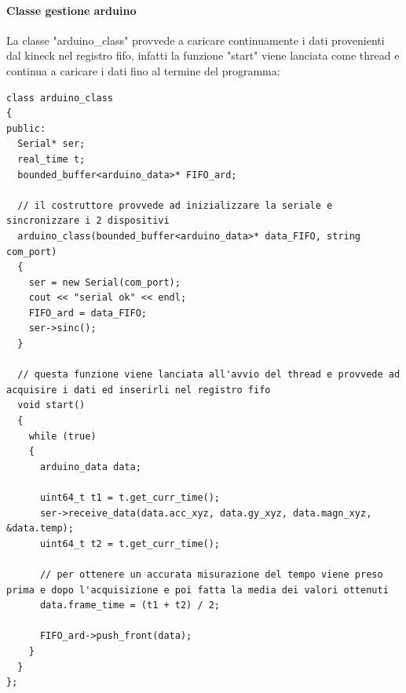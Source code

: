 \documentclass[10pt,a4paper]{article}
\begin{document}
\paragraph{Classe gestione arduino}
La classe "arduino\_class" provvede a caricare continuamente i dati provenienti dal kineck nel registro fifo, infatti la funzione "start" viene lanciata come thread e continua a caricare i dati fino al termine del programma:
\begin{lstlisting}[style=mycpp, caption=librerie usate, captionpos=b]
class arduino_class
{
public:
  Serial* ser;
  real_time t;
  bounded_buffer<arduino_data>* FIFO_ard;

  // il costruttore provvede ad inizializzare la seriale e sincronizzare i 2 dispositivi
  arduino_class(bounded_buffer<arduino_data>* data_FIFO, string com_port)
  {
    ser = new Serial(com_port);
    cout << "serial ok" << endl;
    FIFO_ard = data_FIFO;
    ser->sinc();
  }

  // questa funzione viene lanciata all'avvio del thread e provvede ad acquisire i dati ed inserirli nel registro fifo
  void start()
  {
    while (true)
    {
      arduino_data data;
      
      uint64_t t1 = t.get_curr_time();
      ser->receive_data(data.acc_xyz, data.gy_xyz, data.magn_xyz, &data.temp);
      uint64_t t2 = t.get_curr_time();

	  // per ottenere un accurata misurazione del tempo viene preso prima e dopo l'acquisizione e poi fatta la media dei valori ottenuti
      data.frame_time = (t1 + t2) / 2;

      FIFO_ard->push_front(data);
    }
  }
};
\end{lstlisting}
%
%
\end{document}
